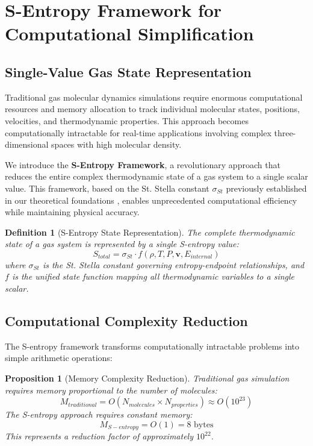 \documentclass[12pt,a4paper]{article}
\newtheorem{definition}{Definition}
\newtheorem{proposition}{Proposition}
\begin{document}
\section{S-Entropy Framework for Computational Simplification}

\subsection{Single-Value Gas State Representation}

Traditional gas molecular dynamics simulations require enormous computational resources and memory allocation to track individual molecular states, positions, velocities, and thermodynamic properties. This approach becomes computationally intractable for real-time applications involving complex three-dimensional spaces with high molecular density.

We introduce the \textbf{S-Entropy Framework}, a revolutionary approach that reduces the entire complex thermodynamic state of a gas system to a single scalar value. This framework, based on the St. Stella constant $\sigma_{St}$ previously established in our theoretical foundations \cite{sachikonye2024sentropy}, enables unprecedented computational efficiency while maintaining physical accuracy.

\begin{definition}[S-Entropy State Representation]
The complete thermodynamic state of a gas system is represented by a single S-entropy value:
\begin{equation}
S_{total} = \sigma_{St} \cdot f(\rho, T, P, \mathbf{v}, E_{internal})
\end{equation}
where $\sigma_{St}$ is the St. Stella constant governing entropy-endpoint relationships, and $f$ is the unified state function mapping all thermodynamic variables to a single scalar.
\end{definition}

\subsection{Computational Complexity Reduction}

The S-entropy framework transforms computationally intractable problems into simple arithmetic operations:

\begin{proposition}[Memory Complexity Reduction]
Traditional gas simulation requires memory proportional to the number of molecules:
\begin{equation}
M_{traditional} = O(N_{molecules} \times N_{properties}) \approx O(10^{23})
\end{equation}
The S-entropy approach requires constant memory:
\begin{equation}
M_{S-entropy} = O(1) = 8 \text{ bytes}
\end{equation}
This represents a reduction factor of approximately $10^{22}$.
\end{proposition}
\end{document}
